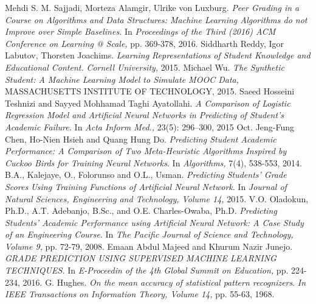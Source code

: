 \clearpage
{}

\begin{thebibliography}{99}
		{Mehdi S. M. Sajjadi, Morteza Alamgir, Ulrike von Luxburg. \emph{Peer Grading in a Course on Algorithms and Data Structures: Machine Learning Algorithms do not Improve over Simple Baselines.} In \emph{Proceedings of the Third (2016) ACM Conference on Learning @ Scale,} pp. 369-378, 2016.}
		{Siddharth Reddy, Igor Labutov, Thorsten Joachims. \emph{Learning Representations of Student Knowledge and Educational Content.} \emph{Cornell University,} 2015.}
		{Michael Wu. \emph{The Synthetic Student: A Machine Learning Model to Simulate MOOC Data,} MASSACHUSETTS INSTITUTE OF TECHNOLOGY, 2015.}
		{Saeed Hosseini Teshnizi and Sayyed Mohhamad Taghi Ayatollahi. \emph{A Comparison of Logistic Regression Model and Artificial Neural Networks in Predicting of Student’s Academic Failure.} In \emph{Acta Inform Med., } 23(5): 296–300, 2015 Oct.}
		{Jeng-Fung Chen, Ho-Nien Hsieh and Quang Hung Do. \emph{Predicting Student Academic Performance: A Comparison of Two Meta-Heuristic Algorithms Inspired by Cuckoo Birds for Training Neural Networks}. In \emph{Algorithms,} 7(4), 538-553, 2014.}
		{B.A., Kalejaye, O., Folorunso and O.L., Usman. \emph{Predicting Students' Grade Scores Using Training Functions of Artificial Neural Network}. In \emph{Journal of Natural Sciences, Engineering and Technology, Volume 14,} 2015.}
		{V.O. Oladokun, Ph.D., A.T. Adebanjo, B.Sc., and O.E. Charles-Owaba, Ph.D. \emph{Predicting Students’ Academic Performance using Artificial Neural Network: A Case Study of an Engineering Course}. In \emph{The Pacific Journal of Science and Technology, Volume 9,} pp. 72-79, 2008.}
		{Emaan Abdul Majeed and Khurum Nazir Junejo. \emph{GRADE PREDICTION USING SUPERVISED MACHINE LEARNING TECHNIQUES.} In \emph{E-Proceedin of the 4th Global Summit on Education,} pp. 224-234, 2016.}
		{G. Hughes. \emph{On the mean accuracy of statistical pattern recognizers}. \emph{In IEEE Transactions on Information Theory, Volume 14,} pp. 55-63, 1968.}
\end{thebibliography}
